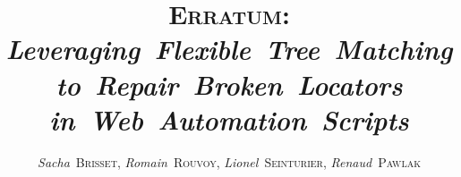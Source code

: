 \documentclass[preprint, 12pt]{elsarticle}
\begin{document}
\theoremstyle{definition}
\newtheorem{defn}{Definition}[section]

\theoremstyle{definition}
\newtheorem{rqn}{RQ}[section]

\theoremstyle{definition}
\newtheorem{note}{Note}[section]

\theoremstyle{remark}
\newtheorem{ex}{Example}[section]

\newcommand{\erratum}[0]{\textsc{Erratum}\xspace}
\newcommand{\erratumlong}[0]{\emph{rEpaiRing bRoken locATors Using tree Matching}}
\title{\erratum: \em Leveraging~Flexible~Tree~Matching to~Repair~Broken~Locators in~Web~Automation~Scripts}
\author{
    \emph{Sacha}~\textsc{Brisset}, 
    \emph{Romain}~\textsc{Rouvoy}, 
    \emph{Lionel}~\textsc{Seinturier}, 
    \emph{Renaud}~\textsc{Pawlak}
}

\end{document}
